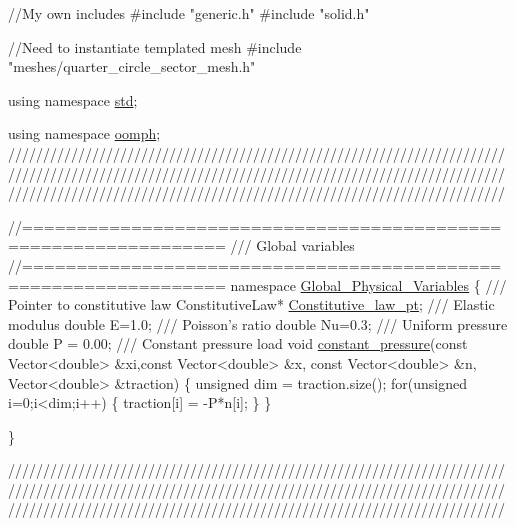 \begin{DoxyCodeInclude}
\textcolor{comment}{//My own includes}
\textcolor{preprocessor}{#include "generic.h"}
\textcolor{preprocessor}{#include "solid.h"}

\textcolor{comment}{//Need to instantiate templated mesh}
\textcolor{preprocessor}{#include "meshes/quarter\_circle\_sector\_mesh.h"}

\textcolor{keyword}{using namespace }\hyperlink{namespacestd}{std};

\textcolor{keyword}{using namespace }\hyperlink{namespaceoomph}{oomph};
 \textcolor{comment}{}
\textcolor{comment}{///////////////////////////////////////////////////////////////////////}
\textcolor{comment}{///////////////////////////////////////////////////////////////////////}
\textcolor{comment}{///////////////////////////////////////////////////////////////////////}
\textcolor{comment}{}

\textcolor{comment}{//================================================================}\textcolor{comment}{}
\textcolor{comment}{/// Global variables}
\textcolor{comment}{}\textcolor{comment}{//================================================================}
\textcolor{keyword}{namespace }\hyperlink{namespaceGlobal__Physical__Variables}{Global\_Physical\_Variables}
\{\textcolor{comment}{}
\textcolor{comment}{ /// Pointer to constitutive law}
\textcolor{comment}{} ConstitutiveLaw* \hyperlink{namespaceGlobal__Physical__Variables_a2a37fb040c832ee7a086bb13bb02a100}{Constitutive\_law\_pt};
\textcolor{comment}{}
\textcolor{comment}{ /// Elastic modulus}
\textcolor{comment}{} \textcolor{keywordtype}{double} E=1.0;
\textcolor{comment}{}
\textcolor{comment}{ /// Poisson's ratio}
\textcolor{comment}{} \textcolor{keywordtype}{double} Nu=0.3;
\textcolor{comment}{}
\textcolor{comment}{ /// Uniform pressure}
\textcolor{comment}{} \textcolor{keywordtype}{double} P = 0.00;
\textcolor{comment}{}
\textcolor{comment}{ /// Constant pressure load}
\textcolor{comment}{} \textcolor{keywordtype}{void} \hyperlink{namespaceGlobal__Physical__Variables_a19f4e20a92e7d216b4d2b00308f96917}{constant\_pressure}(\textcolor{keyword}{const} Vector<double> &xi,\textcolor{keyword}{const} Vector<double> &x,
                        \textcolor{keyword}{const} Vector<double> &n, Vector<double> &traction)
 \{
  \textcolor{keywordtype}{unsigned} dim = traction.size();
  \textcolor{keywordflow}{for}(\textcolor{keywordtype}{unsigned} i=0;i<dim;i++)
   \{
    traction[i] = -P*n[i];
   \}
 \}

\}


\textcolor{comment}{}
\textcolor{comment}{///////////////////////////////////////////////////////////////////////}
\textcolor{comment}{///////////////////////////////////////////////////////////////////////}
\textcolor{comment}{///////////////////////////////////////////////////////////////////////}
\textcolor{comment}{}



\end{DoxyCodeInclude}
